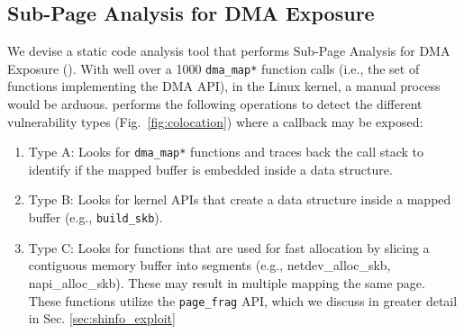 \subsection{Sub-Page Analysis for DMA Exposure}\label{sec:static-analysis}

We devise a static code analysis tool that performs Sub-Page Analysis for DMA Exposure (\tool). With well over a 1000 \texttt{dma\_map*} function calls (i.e., the set of functions implementing the DMA API), in the Linux kernel, a manual process would be arduous. \tool performs the following operations to detect the different \subpage{} vulnerability types (Fig.~\ref{fig:colocation}) where a callback \DIFdelbegin {}\DIFdelend \DIFaddbegin {}\DIFaddend may be exposed:
\begin{enumerate}
    \item Type A: Looks for \texttt{dma\_map*} functions and traces back the call stack to identify if the mapped buffer is embedded inside a data structure.
    \item Type B: Looks for kernel APIs that create a data structure inside a mapped buffer (e.g., \texttt{build\_skb}).
    \item Type C: Looks for functions that are used for fast allocation by slicing a contiguous memory buffer into segments (e.g., netdev\_alloc\_skb, napi\_alloc\_skb). These may result in multiple \DIFdelbegin %
\DIFdelend \DIFaddbegin \iova \DIFaddend mapping the same page. These functions utilize the \texttt{page\_frag} API, which we discuss in greater detail in Sec. \ref{sec:shinfo_exploit} 
\end{enumerate}



